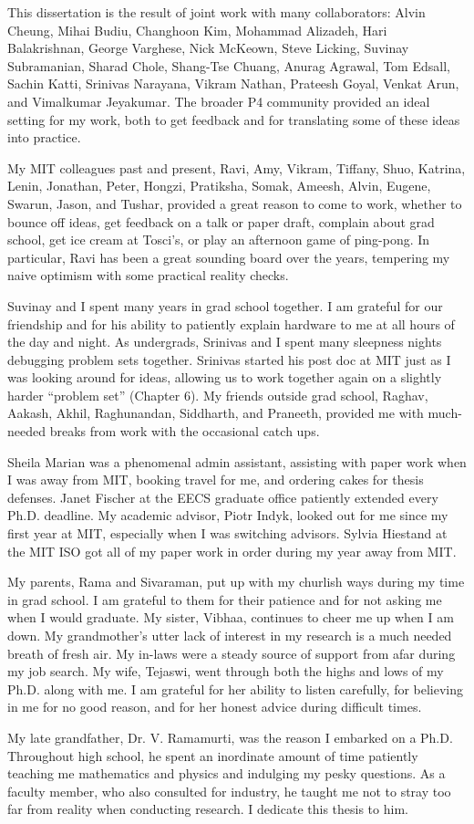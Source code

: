 This dissertation is the result of joint work with many collaborators: Alvin
Cheung, Mihai Budiu, Changhoon Kim, Mohammad Alizadeh, Hari Balakrishnan,
George Varghese, Nick McKeown, Steve Licking, Suvinay Subramanian, Sharad
Chole, Shang-Tse Chuang, Anurag Agrawal, Tom Edsall, Sachin Katti, Srinivas
Narayana, Vikram Nathan, Prateesh Goyal, Venkat Arun, and Vimalkumar Jeyakumar.
The broader P4 community provided an ideal setting for my work, both to get
feedback and for translating some of these ideas into practice. 

My MIT colleagues past and present, Ravi, Amy, Vikram, Tiffany, Shuo,
Katrina, Lenin, Jonathan, Peter, Hongzi, Pratiksha, Somak, Ameesh, Alvin,
Eugene, Swarun, Jason, and Tushar, provided a great reason to come to work, whether to bounce
off ideas, get feedback on a talk or paper draft, complain about grad school,
get ice cream at Tosci's, or play an afternoon game of ping-pong. In
particular, Ravi has been a great sounding board over the years, tempering my
naive optimism with some practical reality checks.

Suvinay and I spent many years in grad school together.  I am grateful for our
friendship and for his ability to patiently explain hardware to me at all hours
of the day and night. As undergrads, Srinivas and I spent many sleepness nights
debugging problem sets together. Srinivas started his post doc at MIT just as I
was looking around for ideas, allowing us to work together again on a slightly
harder ``problem set'' (Chapter 6).  My friends outside grad school, Raghav,
Aakash, Akhil, Raghunandan, Siddharth, and Praneeth, provided me with
much-needed breaks from work with the occasional catch ups.

Sheila Marian was a phenomenal admin assistant, assisting with paper work when
I was away from MIT, booking travel for me, and ordering cakes for thesis
defenses. Janet Fischer at the EECS graduate office patiently extended every
Ph.D.  deadline. My academic advisor, Piotr Indyk, looked out for me since my
first year at MIT, especially when I was switching advisors.  Sylvia Hiestand
at the MIT ISO got all of my paper work in order
during my year away from MIT.

My parents, Rama and Sivaraman, put up with my churlish ways during my time in
grad school. I am grateful to them for their patience and for not asking me
when I would graduate. My sister, Vibhaa, continues to cheer me up when I am
down.  My grandmother's utter lack of interest in my research is a much needed
breath of fresh air. My in-laws were a steady source of support from afar
during my job search. My wife, Tejaswi, went through both the highs and lows of
my Ph.D. along with me. I am grateful for her ability to listen carefully, for
believing in me for no good reason, and for her honest advice during difficult
times. 

My late grandfather, Dr. V. Ramamurti, was the reason I embarked on a Ph.D.
Throughout high school, he spent an inordinate amount of time patiently
teaching me mathematics and physics and indulging my pesky questions. As a
faculty member, who also consulted for industry, he taught me not to stray too
far from reality when conducting research. I dedicate this thesis to him.
